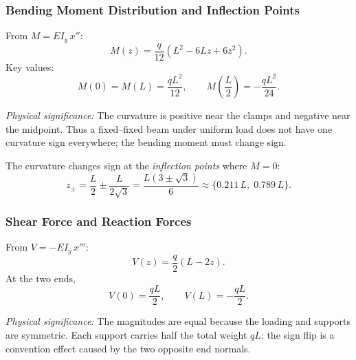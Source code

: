 \documentclass[../main.tex]{subfiles}
\begin{document}
\subsubsection*{Bending Moment Distribution and Inflection Points}

From $M=EI_y\,x''$:
\begin{equation}
  M(z) = \frac{q}{12}\!\left(L^2 - 6Lz + 6z^2\right).
  \label{eq:lec09_moment}
\end{equation}
Key values:
\begin{equation}
  \boxed{
  M(0)=M(L)=\frac{qL^2}{12},
  \qquad
  M\!\left(\frac{L}{2}\right)=-\frac{qL^2}{24}.}
  \label{eq:lec09_moment_key_values}
\end{equation}

\textit{Physical significance:} The curvature is positive near the clamps and negative near the midpoint. Thus a fixed--fixed beam under uniform load does not have one curvature sign everywhere; the bending moment must change sign.

The curvature changes sign at the \emph{inflection points} where $M=0$:
\begin{equation}
  \boxed{z_\pm = \frac{L}{2}\pm\frac{L}{2\sqrt{3}} = \frac{L(3\pm\sqrt{3})}{6} \approx \{0.211\,L,\;0.789\,L\}.}
  \label{eq:lec09_inflection}
\end{equation}

\subsubsection*{Shear Force and Reaction Forces}

From $V=-EI_y\,x'''$:
\begin{equation}
  V(z) = \frac{q}{2}(L-2z).
  \label{eq:lec09_shear}
\end{equation}
At the two ends,
\begin{equation}
  \boxed{V(0)=\frac{qL}{2},
  \qquad
  V(L)=-\frac{qL}{2}.}
  \label{eq:lec09_shear_ends}
\end{equation}

\textit{Physical significance:} The magnitudes are equal because the loading and supports are symmetric. Each support carries half the total weight $qL$; the sign flip is a convention effect caused by the two opposite end normals.
\end{document}
